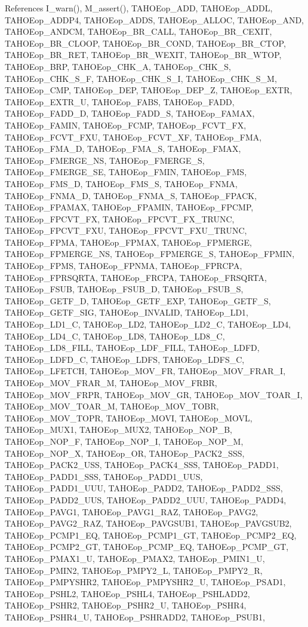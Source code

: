 References I\_\-warn(), M\_\-assert(), TAHOEop\_\-ADD, TAHOEop\_\-ADDL, TAHOEop\_\-ADDP4, TAHOEop\_\-ADDS, TAHOEop\_\-ALLOC, TAHOEop\_\-AND, TAHOEop\_\-ANDCM, TAHOEop\_\-BR\_\-CALL, TAHOEop\_\-BR\_\-CEXIT, TAHOEop\_\-BR\_\-CLOOP, TAHOEop\_\-BR\_\-COND, TAHOEop\_\-BR\_\-CTOP, TAHOEop\_\-BR\_\-RET, TAHOEop\_\-BR\_\-WEXIT, TAHOEop\_\-BR\_\-WTOP, TAHOEop\_\-BRP, TAHOEop\_\-CHK\_\-A, TAHOEop\_\-CHK\_\-S, TAHOEop\_\-CHK\_\-S\_\-F, TAHOEop\_\-CHK\_\-S\_\-I, TAHOEop\_\-CHK\_\-S\_\-M, TAHOEop\_\-CMP, TAHOEop\_\-DEP, TAHOEop\_\-DEP\_\-Z, TAHOEop\_\-EXTR, TAHOEop\_\-EXTR\_\-U, TAHOEop\_\-FABS, TAHOEop\_\-FADD, TAHOEop\_\-FADD\_\-D, TAHOEop\_\-FADD\_\-S, TAHOEop\_\-FAMAX, TAHOEop\_\-FAMIN, TAHOEop\_\-FCMP, TAHOEop\_\-FCVT\_\-FX, TAHOEop\_\-FCVT\_\-FXU, TAHOEop\_\-FCVT\_\-XF, TAHOEop\_\-FMA, TAHOEop\_\-FMA\_\-D, TAHOEop\_\-FMA\_\-S, TAHOEop\_\-FMAX, TAHOEop\_\-FMERGE\_\-NS, TAHOEop\_\-FMERGE\_\-S, TAHOEop\_\-FMERGE\_\-SE, TAHOEop\_\-FMIN, TAHOEop\_\-FMS, TAHOEop\_\-FMS\_\-D, TAHOEop\_\-FMS\_\-S, TAHOEop\_\-FNMA, TAHOEop\_\-FNMA\_\-D, TAHOEop\_\-FNMA\_\-S, TAHOEop\_\-FPACK, TAHOEop\_\-FPAMAX, TAHOEop\_\-FPAMIN, TAHOEop\_\-FPCMP, TAHOEop\_\-FPCVT\_\-FX, TAHOEop\_\-FPCVT\_\-FX\_\-TRUNC, TAHOEop\_\-FPCVT\_\-FXU, TAHOEop\_\-FPCVT\_\-FXU\_\-TRUNC, TAHOEop\_\-FPMA, TAHOEop\_\-FPMAX, TAHOEop\_\-FPMERGE, TAHOEop\_\-FPMERGE\_\-NS, TAHOEop\_\-FPMERGE\_\-S, TAHOEop\_\-FPMIN, TAHOEop\_\-FPMS, TAHOEop\_\-FPNMA, TAHOEop\_\-FPRCPA, TAHOEop\_\-FPRSQRTA, TAHOEop\_\-FRCPA, TAHOEop\_\-FRSQRTA, TAHOEop\_\-FSUB, TAHOEop\_\-FSUB\_\-D, TAHOEop\_\-FSUB\_\-S, TAHOEop\_\-GETF\_\-D, TAHOEop\_\-GETF\_\-EXP, TAHOEop\_\-GETF\_\-S, TAHOEop\_\-GETF\_\-SIG, TAHOEop\_\-INVALID, TAHOEop\_\-LD1, TAHOEop\_\-LD1\_\-C, TAHOEop\_\-LD2, TAHOEop\_\-LD2\_\-C, TAHOEop\_\-LD4, TAHOEop\_\-LD4\_\-C, TAHOEop\_\-LD8, TAHOEop\_\-LD8\_\-C, TAHOEop\_\-LD8\_\-FILL, TAHOEop\_\-LDF\_\-FILL, TAHOEop\_\-LDFD, TAHOEop\_\-LDFD\_\-C, TAHOEop\_\-LDFS, TAHOEop\_\-LDFS\_\-C, TAHOEop\_\-LFETCH, TAHOEop\_\-MOV\_\-FR, TAHOEop\_\-MOV\_\-FRAR\_\-I, TAHOEop\_\-MOV\_\-FRAR\_\-M, TAHOEop\_\-MOV\_\-FRBR, TAHOEop\_\-MOV\_\-FRPR, TAHOEop\_\-MOV\_\-GR, TAHOEop\_\-MOV\_\-TOAR\_\-I, TAHOEop\_\-MOV\_\-TOAR\_\-M, TAHOEop\_\-MOV\_\-TOBR, TAHOEop\_\-MOV\_\-TOPR, TAHOEop\_\-MOVI, TAHOEop\_\-MOVL, TAHOEop\_\-MUX1, TAHOEop\_\-MUX2, TAHOEop\_\-NOP\_\-B, TAHOEop\_\-NOP\_\-F, TAHOEop\_\-NOP\_\-I, TAHOEop\_\-NOP\_\-M, TAHOEop\_\-NOP\_\-X, TAHOEop\_\-OR, TAHOEop\_\-PACK2\_\-SSS, TAHOEop\_\-PACK2\_\-USS, TAHOEop\_\-PACK4\_\-SSS, TAHOEop\_\-PADD1, TAHOEop\_\-PADD1\_\-SSS, TAHOEop\_\-PADD1\_\-UUS, TAHOEop\_\-PADD1\_\-UUU, TAHOEop\_\-PADD2, TAHOEop\_\-PADD2\_\-SSS, TAHOEop\_\-PADD2\_\-UUS, TAHOEop\_\-PADD2\_\-UUU, TAHOEop\_\-PADD4, TAHOEop\_\-PAVG1, TAHOEop\_\-PAVG1\_\-RAZ, TAHOEop\_\-PAVG2, TAHOEop\_\-PAVG2\_\-RAZ, TAHOEop\_\-PAVGSUB1, TAHOEop\_\-PAVGSUB2, TAHOEop\_\-PCMP1\_\-EQ, TAHOEop\_\-PCMP1\_\-GT, TAHOEop\_\-PCMP2\_\-EQ, TAHOEop\_\-PCMP2\_\-GT, TAHOEop\_\-PCMP\_\-EQ, TAHOEop\_\-PCMP\_\-GT, TAHOEop\_\-PMAX1\_\-U, TAHOEop\_\-PMAX2, TAHOEop\_\-PMIN1\_\-U, TAHOEop\_\-PMIN2, TAHOEop\_\-PMPY2\_\-L, TAHOEop\_\-PMPY2\_\-R, TAHOEop\_\-PMPYSHR2, TAHOEop\_\-PMPYSHR2\_\-U, TAHOEop\_\-PSAD1, TAHOEop\_\-PSHL2, TAHOEop\_\-PSHL4, TAHOEop\_\-PSHLADD2, TAHOEop\_\-PSHR2, TAHOEop\_\-PSHR2\_\-U, TAHOEop\_\-PSHR4, TAHOEop\_\-PSHR4\_\-U, TAHOEop\_\-PSHRADD2, TAHOEop\_\-PSUB1, 
